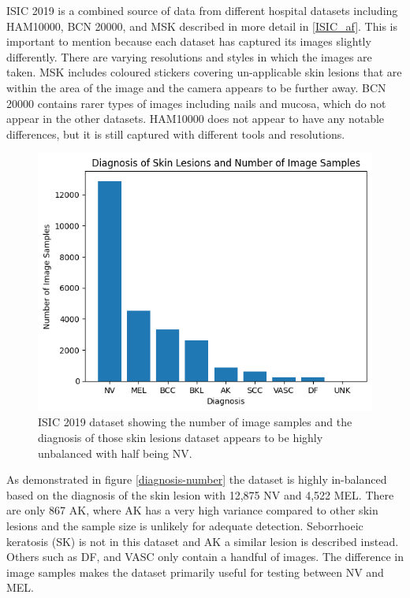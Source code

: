 ISIC 2019 is a combined source of data from different hospital datasets including HAM10000, BCN 20000, and MSK described in more detail in \ref{ISIC_af}. This is important to mention because each dataset has captured its images slightly differently. There are varying resolutions and styles in which the images are taken. MSK includes coloured stickers covering un-applicable skin lesions that are within the area of the image and the camera appears to be further away. BCN 20000 contains rarer types of images including nails and mucosa, which do not appear in the other datasets. HAM10000 does not appear to have any notable differences, but it is still captured with different tools and resolutions. 

\begin{figure}
	\centering
	\includegraphics[scale=0.8]{images/ISIC/diagnosis-number.png}
	\caption{ISIC 2019 dataset showing the number of image samples and the diagnosis of those skin lesions dataset appears to be highly unbalanced with half being NV.} 
\end{figure} \label{diagnosis-number}
	
As demonstrated in figure \ref{diagnosis-number} the dataset is highly in-balanced based on the diagnosis of the skin lesion with 12,875 NV and 4,522 MEL. There are only 867 AK, where AK has a very high variance compared to other skin lesions and the sample size is unlikely for adequate detection. Seborrhoeic keratosis (SK) is not in this dataset and AK a similar lesion is described instead. Others such as DF, and VASC only contain a handful of images. The difference in image samples makes the dataset primarily useful for testing between NV and MEL.

